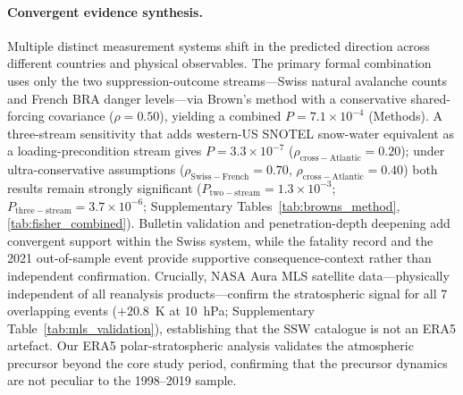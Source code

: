 \documentclass[11pt,letterpaper]{article}
\begin{document}
\paragraph{Convergent evidence synthesis.} Multiple distinct measurement systems shift in the predicted direction across different countries and physical observables. The primary formal combination uses only the two suppression-outcome streams---Swiss natural avalanche counts and French BRA danger levels---via Brown's method\cite{Brown1975,Poole2016} with a conservative shared-forcing covariance ($\rho = 0.50$), yielding a combined $P = 7.1 \times 10^{-4}$ (Methods). A three-stream sensitivity that adds western-US SNOTEL snow-water equivalent as a loading-precondition stream gives $P = 3.3 \times 10^{-7}$ ($\rho_{\mathrm{cross-Atlantic}} = 0.20$); under ultra-conservative assumptions ($\rho_{\mathrm{Swiss-French}} = 0.70$, $\rho_{\mathrm{cross-Atlantic}} = 0.40$) both results remain strongly significant ($P_{\mathrm{two-stream}} = 1.3 \times 10^{-3}$; $P_{\mathrm{three-stream}} = 3.7 \times 10^{-6}$; Supplementary Tables~\ref{tab:browns_method}, \ref{tab:fisher_combined}). Bulletin validation and penetration-depth deepening add convergent support within the Swiss system, while the fatality record and the 2021 out-of-sample event provide supportive consequence-context rather than independent confirmation. Crucially, NASA Aura MLS satellite data---physically independent of all reanalysis products---confirm the stratospheric signal for all 7 overlapping events ($+20.8$~K at 10~hPa; Supplementary Table~\ref{tab:mls_validation}), establishing that the SSW catalogue is not an ERA5 artefact. Our ERA5 polar-stratospheric analysis validates the atmospheric precursor beyond the core study period, confirming that the precursor dynamics are not peculiar to the 1998--2019 sample.
\end{document}
